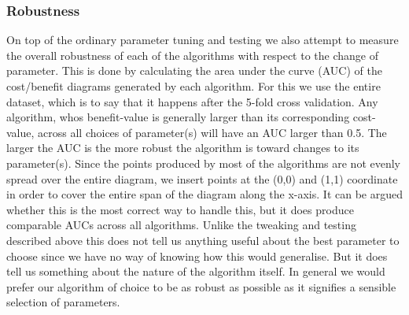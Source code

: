 \subsubsection{Robustness} \label{sec:robustness}
%
On top of the ordinary parameter tuning and testing we also attempt to measure the overall robustness of each of the algorithms with respect to the change of parameter. This is done by calculating the area under the curve (AUC) of the cost/benefit diagrams generated by each algorithm. For this we use the entire dataset, which is to say that it happens after the 5-fold cross validation. Any algorithm, whos benefit-value is generally larger than its corresponding cost-value, across all choices of parameter(s) will have an AUC larger than 0.5. The larger the AUC is the more robust the algorithm is toward changes to its parameter(s). Since the points produced by most of the algorithms are not evenly spread over the entire diagram, we insert points at the (0,0) and (1,1) coordinate in order to cover the entire span of the diagram along the x-axis. It can be argued whether this is the most correct way to handle this, but it does produce comparable AUCs across all algorithms. Unlike the tweaking and testing described above this does not tell us anything useful about the best parameter to choose since we have no way of knowing how this would generalise. But it does tell us something about the nature of the algorithm itself. In general we would prefer our algorithm of choice to be as robust as possible as it signifies a sensible selection of parameters. 
%
